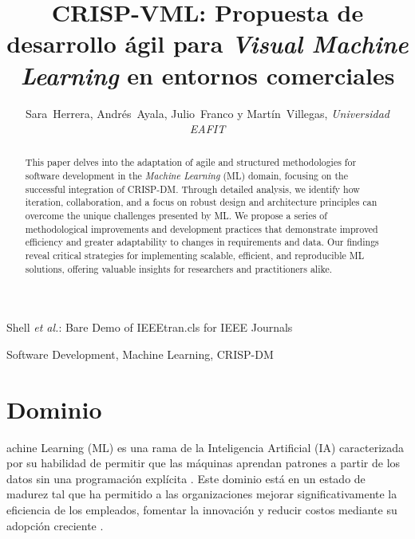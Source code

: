 \documentclass[journal]{IEEEtran}
\begin{document}

\title{CRISP-VML: Propuesta de desarrollo ágil para \textit{Visual Machine Learning} en entornos comerciales}

\author{Sara~Herrera, Andrés~Ayala, Julio~Franco y Martín~Villegas, \textit{Universidad EAFIT}}

%
{Shell \MakeLowercase{\textit{et al.}}: Bare Demo of IEEEtran.cls for IEEE Journals}

\maketitle

\begin{abstract}
This paper delves into the adaptation of agile and structured methodologies for software development in the \textit{Machine Learning} (ML) domain, focusing on the successful integration of CRISP-DM. Through detailed analysis, we identify how iteration, collaboration, and a focus on robust design and architecture principles can overcome the unique challenges presented by ML. We propose a series of methodological improvements and development practices that demonstrate improved efficiency and greater adaptability to changes in requirements and data. Our findings reveal critical strategies for implementing scalable, efficient, and reproducible ML solutions, offering valuable insights for researchers and practitioners alike.
\end{abstract}

\begin{IEEEkeywords}
Software Development, Machine Learning, CRISP-DM
\end{IEEEkeywords}


\IEEEpeerreviewmaketitle


\section{Dominio}
achine Learning (ML) es una rama de la Inteligencia Artificial (IA) caracterizada por su habilidad de permitir que las máquinas aprendan patrones a partir de los datos sin una programación explícita \cite{Russell2021-eg}. Este dominio está en un estado de madurez tal que ha permitido a las organizaciones mejorar significativamente la eficiencia de los empleados, fomentar la innovación y reducir costos mediante su adopción creciente \cite{ibmWhatMachine}.\\
\end{document}
